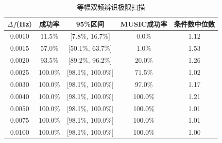 \documentclass[withoutpreface,bwprint]{cumcmthesis}
\begin{document}
\begin{longtable}{ccccc}
    \caption{等幅双频辨识极限扫描}\label{tab:q3_resolution}\\
    \toprule
    $\Delta f$(Hz) & 成功率 & 95\%区间 & MUSIC成功率 & 条件数中位数 \\
    \midrule
    0.0010 & 11.5\% & [7.8\%, 16.7\%] & 0.0\% & 1.12 \\
    0.0015 & 57.0\% & [50.1\%, 63.7\%] & 1.0\% & 1.53 \\
    0.0020 & 93.5\% & [89.2\%, 96.2\%] & 20.0\% & 1.26 \\
    0.0025 & 100.0\% & [98.1\%, 100.0\%] & 71.5\% & 1.02 \\
    0.0030 & 100.0\% & [98.1\%, 100.0\%] & 97.0\% & 1.17 \\
    0.0040 & 100.0\% & [98.1\%, 100.0\%] & 100.0\% & 1.21 \\
    0.0050 & 100.0\% & [98.1\%, 100.0\%] & 100.0\% & 1.01 \\
    0.0075 & 100.0\% & [98.1\%, 100.0\%] & 100.0\% & 1.01 \\
    0.0100 & 100.0\% & [98.1\%, 100.0\%] & 100.0\% & 1.00 \\
    \bottomrule
\end{longtable}

\begin{table}[!htbp]
\centering
\caption{条件化近频实验的90\%经验辨识间隔（每格200次）}\label{tab:q3_conditional_resolution}
\end{table}
\FloatBarrier
\end{document}
